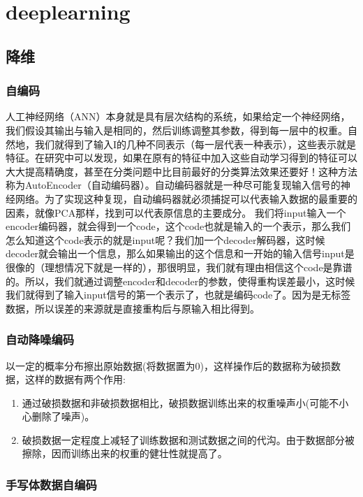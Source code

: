 \chapter{deeplearning}
\section{降维}
\subsection{自编码}
人工神经网络（ANN）本身就是具有层次结构的系统，如果给定一个神经网络，我们假设其输出与输入是相同的，然后训练调整其参数，得到每一层中的权重。自然地，我们就得到了输入I的几种不同表示（每一层代表一种表示），这些表示就是特征。在研究中可以发现，如果在原有的特征中加入这些自动学习得到的特征可以大大提高精确度，甚至在分类问题中比目前最好的分类算法效果还要好！这种方法称为AutoEncoder（自动编码器）。自动编码器就是一种尽可能复现输入信号的神经网络。为了实现这种复现，自动编码器就必须捕捉可以代表输入数据的最重要的因素，就像PCA那样，找到可以代表原信息的主要成分。
我们将input输入一个encoder编码器，就会得到一个code，这个code也就是输入的一个表示，那么我们怎么知道这个code表示的就是input呢？我们加一个decoder解码器，这时候decoder就会输出一个信息，那么如果输出的这个信息和一开始的输入信号input是很像的（理想情况下就是一样的），那很明显，我们就有理由相信这个code是靠谱的。所以，我们就通过调整encoder和decoder的参数，使得重构误差最小，这时候我们就得到了输入input信号的第一个表示了，也就是编码code了。因为是无标签数据，所以误差的来源就是直接重构后与原输入相比得到。
\subsection{自动降噪编码}
以一定的概率分布擦出原始数据(将数据置为0)，这样操作后的数据称为破损数据，这样的数据有两个作用:
\begin{enumerate}
\item 通过破损数据和非破损数据相比，破损数据训练出来的权重噪声小(可能不小心删除了噪声)。
\item 破损数据一定程度上减轻了训练数据和测试数据之间的代沟。由于数据部分被擦除，因而训练出来的权重的健壮性就提高了。
\end{enumerate}
\subsection{手写体数据自编码}


